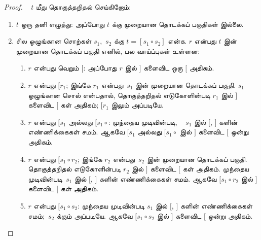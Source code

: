 \documentclass[../../../include/open-logic-section]{subfiles}
\begin{document}
\begin{proof}
  ~ $t$ மீது தொகுத்தறிதல் செய்கிறோம்:
  \begin{enumerate}
  \item $t$ ஒரு தனி எழுத்து: அப்போது $t$
    க்கு முறையான தொடக்கப் பகுதிகள் இல்லை.
  \item சில ஒழுங்கான சொற்கள் $s_1$,~$s_2$
    க்கு $t = [s_1 \circ s_2]$ என்க.
    $r$ என்பது $t$ இன் முறையான தொடக்கப்
    பகுதி எனில், பல வாய்ப்புகள் உள்ளன:
    \begin{enumerate}
    \item $r$ என்பது வெறும் $[$: அப்போது
      $r$ இல் $]$ களைவிட ஒரு $[$ அதிகம்.
    \item $r$ என்பது $[r_1$; இங்கே $r_1$
      என்பது~$s_1$ இன் முறையான தொடக்கப்
      பகுதி. $s_1$ ஒழுங்கான சொல் என்பதால்,
      தொகுத்தறிதல் எடுகோளின்படி $r_1$ இல்
      $]$ களைவிட $[$ கள் அதிகம்;
      $[r_1$ இலும் அப்படியே.
    \item $r$ என்பது $[s_1$ அல்லது
      $[s_1 \circ {}$: முந்தைய முடிவின்படி,
      ~ $s_1$ இல் $[$, $]$ களின்
      எண்ணிக்கைகள் சமம். ஆகவே $[s_1$
      அல்லது $[s_1 \circ {}$ இல் $]$
      களைவிட $[$ ஒன்று அதிகம்.
    \item $r$ என்பது $[s_1 \circ r_2$;
      இங்கே $r_2$ என்பது~$s_2$ இன் முறையான
      தொடக்கப் பகுதி. தொகுத்தறிதல் எடுகோளின்படி
      $r_2$ இல் $]$ களைவிட $[$ கள்
      அதிகம். முந்தைய முடிவின்படி~$s_1$
      இல் $[$, $]$ களின் எண்ணிக்கைகள்
      சமம். ஆகவே $[s_1 \circ r_2$ இல்
      $]$ களைவிட $[$ கள் அதிகம்.
    \item $r$ என்பது $[s_1 \circ s_2$:
      முந்தைய முடிவின்படி $s_1$ இல் $[$,
      $]$ களின் எண்ணிக்கைகள் சமம்;~$s_2$
      க்கும் அப்படியே. ஆகவே $[s_1 \circ s_2$
      இல் $]$ களைவிட $[$ ஒன்று அதிகம்.
    \end{enumerate}
  \end{enumerate}
\end{proof}
\end{document}

